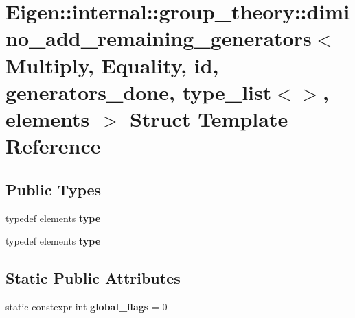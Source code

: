 \hypertarget{struct_eigen_1_1internal_1_1group__theory_1_1dimino__add__remaining__generators_3_01_multiply_00d4c8f7ea21da2ce5b9e3ae885466184b}{}\section{Eigen\+:\+:internal\+:\+:group\+\_\+theory\+:\+:dimino\+\_\+add\+\_\+remaining\+\_\+generators$<$ Multiply, Equality, id, generators\+\_\+done, type\+\_\+list$<$$>$, elements $>$ Struct Template Reference}
\label{struct_eigen_1_1internal_1_1group__theory_1_1dimino__add__remaining__generators_3_01_multiply_00d4c8f7ea21da2ce5b9e3ae885466184b}
\subsection*{Public Types}
\begin{DoxyCompactItemize}
\item 
\mbox{\label{struct_eigen_1_1internal_1_1group__theory_1_1dimino__add__remaining__generators_3_01_multiply_00d4c8f7ea21da2ce5b9e3ae885466184b_a297f2c3b36711606eca7e4f03d8eabbf}} 
typedef elements {\bfseries type}
\item 
\mbox{\label{struct_eigen_1_1internal_1_1group__theory_1_1dimino__add__remaining__generators_3_01_multiply_00d4c8f7ea21da2ce5b9e3ae885466184b_a297f2c3b36711606eca7e4f03d8eabbf}} 
typedef elements {\bfseries type}
\end{DoxyCompactItemize}
\subsection*{Static Public Attributes}
\begin{DoxyCompactItemize}
\item 
\mbox{\label{struct_eigen_1_1internal_1_1group__theory_1_1dimino__add__remaining__generators_3_01_multiply_00d4c8f7ea21da2ce5b9e3ae885466184b_a9d50ff764c20db77bfe930eff9774026}} 
static constexpr int {\bfseries global\+\_\+flags} = 0
\end{DoxyCompactItemize}


